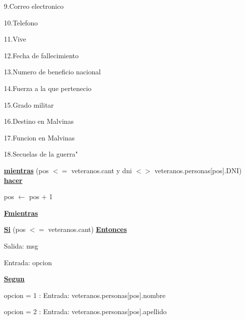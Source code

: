 \documentclass{article}
\begin{document}
                \hspace{25mm}9.Correo electronico

                \hspace{25mm}10.Telefono

                \hspace{25mm}11.Vive

                \hspace{25mm}12.Fecha de fallecimiento

                \hspace{25mm}13.Numero de beneficio nacional

                \hspace{25mm}14.Fuerza a la que pertenecio

                \hspace{25mm}15.Grado militar

                \hspace{25mm}16.Destino en Malvinas

                \hspace{25mm}17.Funcion en Malvinas

                \hspace{25mm}18.Secuelas de la guerra"

            \hspace{12mm}\underline{\textbf{mientras}} (pos $<=$ veteranos.cant y dni $<>$ veteranos.personas[pos].DNI) \underline{\textbf{hacer}}

                \hspace{16mm}pos $\leftarrow$ pos + 1

            \hspace{12mm}\underline{\textbf{Fmientras}}

            \hspace{12mm}\underline{\textbf{Si}} (pos $<=$ veteranos.cant) \underline{\textbf{Entonces}}

                \hspace{16mm} Salida: msg

                \hspace{16mm}Entrada: opcion

                \hspace{16mm}\underline{\textbf{Segun}}

                    \hspace{20mm}opcion = 1 : Entrada: veteranos.personas[pos].nombre

                    \hspace{20mm}opcion = 2 : Entrada: veteranos.personas[pos].apellido
                    
\end{document}
